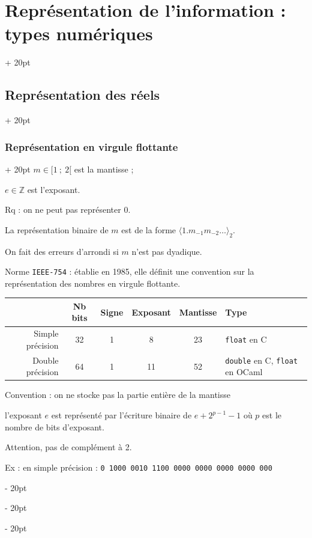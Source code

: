 \documentclass[a4paper, 12pt, twoside]{article}
\newcommand{\ind}[1][20pt]{\advance\leftskip + #1}
\newcommand{\deind}[1][20pt]{\advance\leftskip - #1}
\newenvironment{indentedenv}[1][20pt]{\par \ind[#1]}{\par \deind}
\newenvironment{indt}[2][20pt]{#2 \begin{indentedenv}[#1]}{\end{indentedenv}} %
\begin{document}
\begin{indt}{\section{Représentation de l'information : types numériques}}
\begin{indt}{\subsection{Représentation des réels}}
\begin{indt}{\subsubsection{Représentation en virgule flottante}}
                $m \in [1\ ;\ 2[$ est la mantisse ;
                
                $e \in \mathbb{Z}$ est l'exposant.
                
                \vspace{6pt}
                
                Rq : on ne peut pas représenter 0.
                
                La représentation binaire de $m$ est de la forme $\langle 1.m_{-1} m_{-2} \ldots \rangle_2$.
                
                On fait des erreurs d'arrondi si $m$ n'est pas dyadique.
                
                \vspace{12pt}
                
                Norme \texttt{IEEE-754} : établie en 1985, elle définit une convention sur la représentation des nombres en virgule flottante.
                
                \begin{tabular}{|r|c|c|c|c|p{100pt}|}
                    \hline
                    & Nb bits & Signe & Exposant & Mantisse & Type
                    \\
                    \hline
                    Simple précision
                    & 32
                    & 1
                    & 8
                    & 23
                    & \texttt{float} en C
                    \\
                    \hline
                    Double précision
                    & 64
                    & 1
                    & 11
                    & 52
                    & \texttt{double} en C, \texttt{float} en OCaml
                    \\
                    \hline
                \end{tabular}
                
                Convention : on ne stocke pas la partie entière de la mantisse
                
                l'exposant $e$ est représenté par l'écriture binaire de $e + 2^{p - 1} - 1$ où $p$ est le nombre de bits d'exposant.
                
                Attention, pas de complément à 2.
                
                Ex : en simple précision : \texttt{0 1000 0010 1100 0000 0000 0000 0000 000}
                

\end{indt}
\end{indt}
\end{indt}
\end{document}

